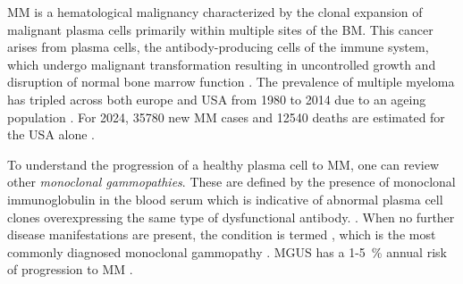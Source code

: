 





%
\label{sec:intro_myeloma}%
\ac{MM} is a hematological malignancy characterized by the
clonal expansion of malignant plasma cells primarily within multiple sites of
the \ac{BM}. This cancer arises from plasma cells, the
antibody-producing cells of the immune system, which undergo malignant
transformation resulting in uncontrolled growth and disruption of normal bone
marrow function \cite{yangPathogenesisTreatmentMultiple2022}. The prevalence of
multiple myeloma has tripled across both europe and USA from 1980 to 2014 due to
an ageing population \cite{ociasTrendsHematologicalCancer2016,
    turessonRapidlyChangingMyeloma2018}. For 2024, 35780 new \ac{MM} cases and 12540
deaths are estimated for the USA alone \cite{siegelCancerStatistics20242024}.

To understand the progression of a healthy plasma cell to \ac{MM}, one can
review other \emph{monoclonal gammopathies}. These are defined by the presence
of monoclonal immunoglobulin in the blood serum which is indicative of abnormal
plasma cell clones overexpressing the same type of dysfunctional antibody.
\cite{kyleMonoclonalGammopathyUndetermined1997,
    fermandMonoclonalGammopathyClinical2018}. When no further disease manifestations
are present, the condition is termed , which is the most commonly
diagnosed monoclonal gammopathy \cite{kyleMonoclonalGammopathyUndetermined1997}.
\ac{MGUS} has a 1-\SI{5}{\percent} annual risk of progression to \ac{MM}
\cite{rajkumarInternationalMyelomaWorking2014}.

